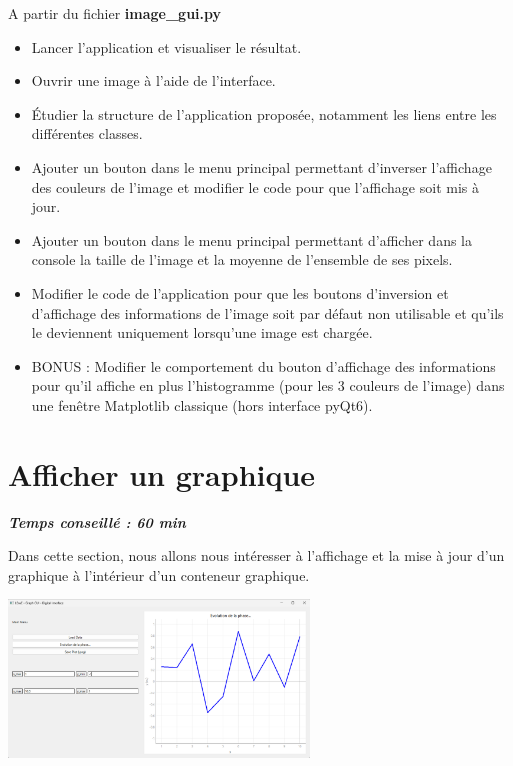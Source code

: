 \documentclass[a4paper,11pt,titlepage]{article} %
\begin{document}
A partir du fichier \textbf{image\_gui.py}

\begin{itemize}
	\item Lancer l'application et visualiser le résultat.
	\item Ouvrir une image à l'aide de l'interface.
	\item Étudier la structure de l'application proposée, notamment les liens entre les différentes classes.

	\medskip	
	
	\item Ajouter un bouton dans le menu principal permettant d'inverser l'affichage des couleurs de l'image et modifier le code pour que l'affichage soit mis à jour.
	\item Ajouter un bouton dans le menu principal permettant d'afficher dans la console la taille de l'image et la moyenne de l'ensemble de ses pixels.
	\item Modifier le code de l'application pour que les boutons d'inversion et d'affichage des informations de l'image soit par défaut non utilisable et qu'ils le deviennent uniquement lorsqu'une image est chargée.
	\item BONUS : Modifier le comportement du bouton d'affichage des informations pour qu'il affiche en plus l'histogramme (pour les 3 couleurs de l'image) dans une fenêtre Matplotlib classique (hors interface pyQt6).
\end{itemize}

\newpage
\section{Afficher un graphique}

\begin{center} \textbf{\textit{Temps conseillé : 60 min}} \end{center}

Dans cette section, nous allons nous intéresser à l'affichage et la mise à jour d'un graphique à l'intérieur d'un conteneur graphique.

\begin{center}
	\includegraphics[width=0.6\textwidth]{images/graph_gui.png}
\end{center}
\end{document}
